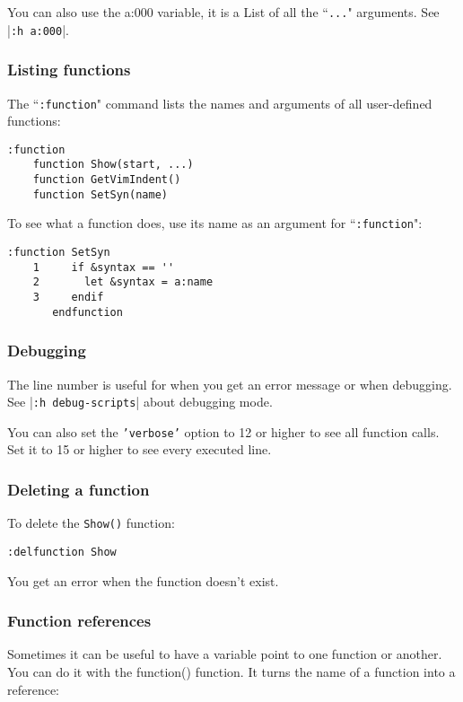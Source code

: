 You can also use the a:000 variable, it is a List of all the ``\texttt{...}" arguments.
See |\texttt{:h a:000}|.

\subsubsection{Listing functions}
The ``\texttt{:function}" command lists the names and arguments of all user-defined
functions:

\begin{Verbatim}[samepage=true]
 :function
    function Show(start, ...)
    function GetVimIndent()
    function SetSyn(name)
\end{Verbatim}

To see what a function does, use its name as an argument for ``\texttt{:function}":

\begin{Verbatim}[samepage=true]
 :function SetSyn
    1     if &syntax == ''
    2       let &syntax = a:name
    3     endif
       endfunction
\end{Verbatim}

\subsubsection{Debugging}
The line number is useful for when you get an error message or when debugging.
See |\texttt{:h debug-scripts}| about debugging mode.

You can also set the \texttt{'verbose'} option to 12 or higher to see all function calls.
Set it to 15 or higher to see every executed line.

\subsubsection{Deleting a function}
To delete the \texttt{Show()} function:

\begin{Verbatim}[samepage=true]
 :delfunction Show
\end{Verbatim}

You get an error when the function doesn't exist.

\subsubsection{Function references}
Sometimes it can be useful to have a variable point to one function or another.
You can do it with the function() function.
It turns the name of a function into a reference:

